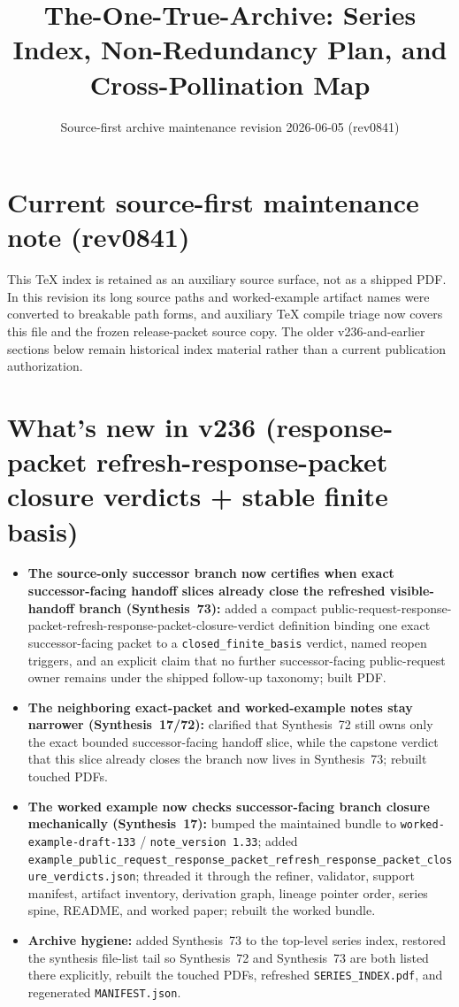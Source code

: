 \documentclass[11pt]{article}
\title{The-One-True-Archive: Series Index, Non-Redundancy Plan, and Cross-Pollination Map}
\author{}
\date{Source-first archive maintenance revision 2026-06-05 (rev0841)}
\begin{document}
\maketitle

\section{Current source-first maintenance note (rev0841)}
This TeX index is retained as an auxiliary source surface, not as a shipped PDF.
In this revision its long source paths and worked-example artifact names were converted to breakable path forms, and auxiliary TeX compile triage now covers this file and the frozen release-packet source copy.
The older v236-and-earlier sections below remain historical index material rather than a current publication authorization.



\section{What's new in v236 (response-packet refresh-response-packet closure verdicts + stable finite basis)}
\begin{itemize}[leftmargin=*]
\item \textbf{The source-only successor branch now certifies when exact successor-facing handoff slices already close the refreshed visible-handoff branch (Synthesis~73):} added a compact public-request-response-packet-refresh-response-packet-closure-verdict definition binding one exact successor-facing packet to a \texttt{closed\_finite\_basis} verdict, named reopen triggers, and an explicit claim that no further successor-facing public-request owner remains under the shipped follow-up taxonomy; built PDF.
\item \textbf{The neighboring exact-packet and worked-example notes stay narrower (Synthesis~17/72):} clarified that Synthesis~72 still owns only the exact bounded successor-facing handoff slice, while the capstone verdict that this slice already closes the branch now lives in Synthesis~73; rebuilt touched PDFs.
\item \textbf{The worked example now checks successor-facing branch closure mechanically (Synthesis~17):} bumped the maintained bundle to \texttt{worked-example-draft-133} / \texttt{note\_version 1.33}; added \texttt{example\_public\_request\_response\_packet\_refresh\_response\_packet\_closure\_verdicts.json}; threaded it through the refiner, validator, support manifest, artifact inventory, derivation graph, lineage pointer order, series spine, README, and worked paper; rebuilt the worked bundle.
\item \textbf{Archive hygiene:} added Synthesis~73 to the top-level series index, restored the synthesis file-list tail so Synthesis~72 and Synthesis~73 are both listed there explicitly, rebuilt the touched PDFs, refreshed \texttt{SERIES\_INDEX.pdf}, and regenerated \texttt{MANIFEST.json}.
\end{itemize}
\end{document}
